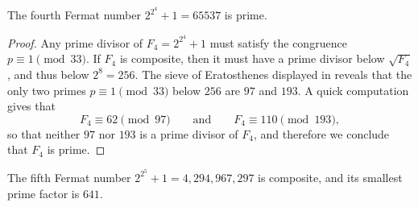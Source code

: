 \begin{corollary}\label{corollary:F4}
  The fourth Fermat number $2^{2^4}+1=65537$ is prime.
\end{corollary}

\begin{proof}
  Any prime divisor of $F_4=2^{2^4}+1$ must satisfy the congruence $p\equiv 1\pmod{33}$. If $F_4$ is composite, then it must have a prime divisor below $\sqrt{F_4}$, and thus below $2^8=256$. The sieve of Eratosthenes displayed in  reveals that the only two primes $p\equiv 1\pmod{33}$ below $256$ are $97$ and $193$. A quick computation gives that
  \begin{equation*}
    F_4\equiv 62\pmod{97}\qquad\text{and}\qquad F_4\equiv 110\pmod{193},
  \end{equation*}
  so that neither $97$ nor $193$ is a prime divisor of $F_4$, and therefore we conclude that $F_4$ is prime.
\end{proof}

\begin{corollary}\label{corollary:F5}
  The fifth Fermat number $2^{2^5}+1=4,294,967,297$ is composite, and its smallest prime factor is $641$.
\end{corollary}

